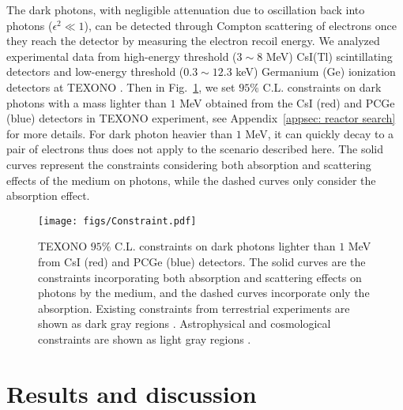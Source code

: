 \documentclass[prd,showpacs,preprintnumbers,amsmath,amssymb,twocolumn,superscriptaddress,notitlepage]{revtex4-2}
\begin{document}
The dark photons, with negligible attenuation due to oscillation back into photons ($\epsilon^2 \ll 1$), can be detected through Compton scattering of electrons once they reach the detector
by measuring the electron recoil energy.
% 
We analyzed experimental data \cite{TEXONO:2009knm, TEXONO:2014eky, TEXONO:2018nir} from high-energy threshold ($3 \sim 8$ MeV) CsI(Tl) scintillating detectors \cite{TEXONO:2009knm} and low-energy threshold ($0.3 \sim 12.3$ keV) Germanium (Ge) ionization detectors \cite{TEXONO:2014eky} at TEXONO \cite{TEXONO:2000zzq}.
Then in Fig.~\ref{fig:constraint},
we set $95\%$ C.L. constraints on dark photons with a mass lighter than $1$ MeV obtained from the CsI (red) and PCGe (blue) detectors in TEXONO experiment, see Appendix~\ref{appsec: reactor search} for more details. For dark photon heavier than $1$ MeV, it can quickly decay to a pair of electrons thus does not apply to the scenario described here.
% 
The solid curves represent the constraints considering both absorption and scattering effects of the medium on photons, while the dashed curves only consider the absorption effect. 







\begin{figure}[htbp]
\begin{centering} 
\texttt{[image: figs/Constraint.pdf]}
\caption{TEXONO $95\%$ C.L. constraints on dark photons lighter than $1$ MeV from CsI (red) and PCGe (blue) detectors.
The solid curves are the constraints incorporating both absorption and scattering effects on photons by the medium, and the dashed curves incorporate only the absorption. Existing constraints from terrestrial experiments are shown as dark gray regions 
\cite{Jaeckel:2010xx, Schwarz:2015lqa, Banerjee:2019pds, Fabbrichesi:2020wbt}.
Astrophysical and cosmological constraints are shown as light gray regions \cite{Redondo:2008aa, Redondo:2013lna, Vinyoles:2015aba, Chang:2016ntp, Hong:2020bxo}. 
}
\label{fig:constraint}
\end{centering}
\end{figure}




\section{Results and discussion}
\end{document}
